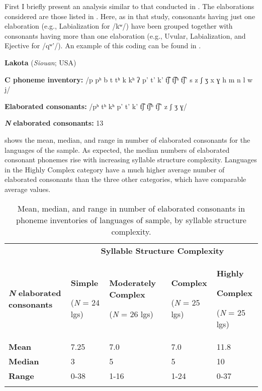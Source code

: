   First I briefly present an analysis similar to that conducted in \citet{MaddiesonEtAl2013}. The elaborations considered are those listed in . Here, as in that study, consonants having just one elaboration (e.g., Labialization for /kʷ/) have been grouped together with consonants having more than one elaboration (e.g., Uvular, Labialization, and Ejective for /qʷ’/). An example of this coding can be found in .

\ea\label{ex:4.26}
  \textbf{Lakota} (\textit{Siouan}; USA)

\textbf{C phoneme inventory:} /p pʰ b t tʰ k kʰ ʔ p’ t’ k’ t͡ʃ t͡ʃʰ t͡ʃ’ s z ʃ ʒ x ɣ h m n l w j/

\textbf{Elaborated consonants:} /pʰ tʰ kʰ p’ t’ k’ t͡ʃ t͡ʃʰ t͡ʃ’ z ʃ ʒ ɣ/

\textbf{\textit{N}} \textbf{elaborated consonants:} 13
\z

   shows the mean, median, and range in number of elaborated consonants for the languages of the sample. As expected, the median numbers of elaborated consonant phonemes rise with increasing syllable structure complexity. Languages in the Highly Complex category have a much higher average number of elaborated consonants than the three other categories, which have comparable average values.

\begin{table}
\begin{tabularx}{\textwidth}{XXXXX}
 & \multicolumn{4}{c}{ \textbf{Syllable Structure Complexity}}\\
\lsptoprule
\textbf{\textit{N}} \textbf{elaborated consonants} & { \textbf{Simple}}

 (\textit{N} = 24 lgs) & { \textbf{Moderately Complex}}

 (\textit{N} = 26 lgs) & { \textbf{Complex}}

 (\textit{N} = 25 lgs) & { \textbf{Highly} }

{ \textbf{Complex}}

 (\textit{N} = 25 lgs)\\
\textbf{Mean} & 7.25 & 7.0 & 7.0 & 11.8\\
\textbf{Median} & 3 & 5 & 5 & 10\\
\textbf{Range} & 0-38 & 1-16 & 1-24 & 0-37\\
\lspbottomrule
\end{tabularx}
\caption{\label{tab:4.10}Mean, median, and range in number of elaborated consonants in phoneme inventories of languages of sample, by syllable structure complexity.}
\end{table}

